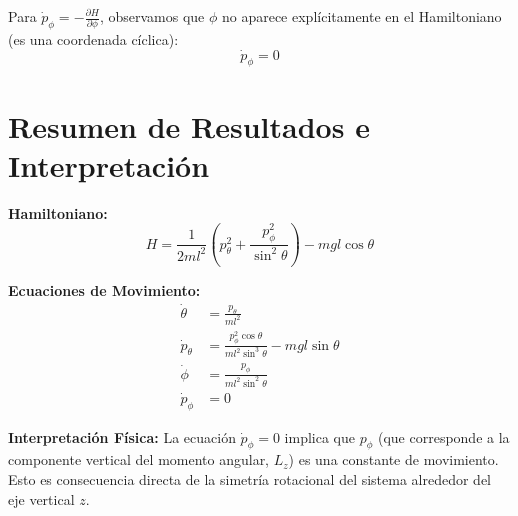 \documentclass[12pt, a4paper]{article}
\begin{document}
Para $\dot{p}_\phi = -\frac{\partial H}{\partial \phi}$, observamos que $\phi$ no aparece explícitamente en el Hamiltoniano (es una coordenada cíclica):
\begin{equation}
    \dot{p}_\phi = 0
\end{equation}

\section*{Resumen de Resultados e Interpretación}

\textbf{Hamiltoniano:}
\begin{equation}
    H = \frac{1}{2ml^2}\left(p_\theta^2 + \frac{p_\phi^2}{\sin^2\theta}\right) - mgl \cos\theta
\end{equation}

\textbf{Ecuaciones de Movimiento:}
\begin{align}
    \dot{\theta} &= \frac{p_\theta}{ml^2} \\
    \dot{p}_\theta &= \frac{p_\phi^2 \cos\theta}{ml^2 \sin^3\theta} - mgl \sin\theta \\
    \dot{\phi} &= \frac{p_\phi}{ml^2 \sin^2\theta} \\
    \dot{p}_\phi &= 0
\end{align}

\textbf{Interpretación Física:}
La ecuación $\dot{p}_\phi = 0$ implica que $p_\phi$ (que corresponde a la componente vertical del momento angular, $L_z$) es una constante de movimiento. Esto es consecuencia directa de la simetría rotacional del sistema alrededor del eje vertical $z$.
\end{document}
